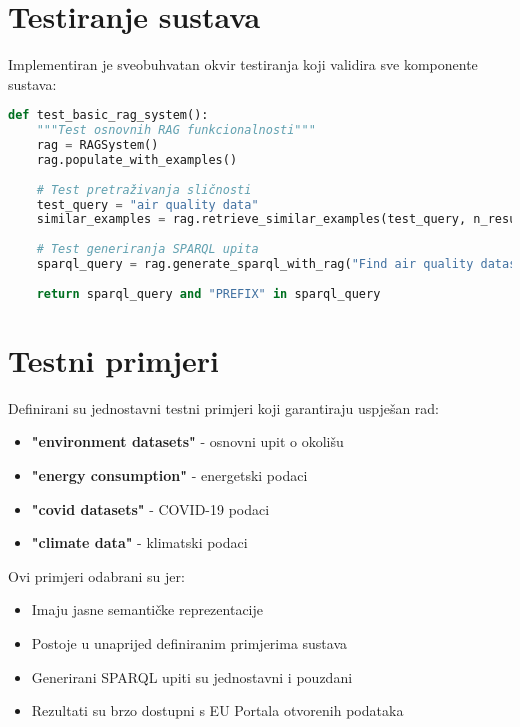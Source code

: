 \section{Testiranje sustava}
\label{sec:testing_system}

Implementiran je sveobuhvatan okvir testiranja koji validira sve komponente sustava:

\begin{lstlisting}[language=Python, caption=Jednostavan test RAG sustava]
def test_basic_rag_system():
    """Test osnovnih RAG funkcionalnosti"""
    rag = RAGSystem()
    rag.populate_with_examples()
    
    # Test pretraživanja sličnosti
    test_query = "air quality data"
    similar_examples = rag.retrieve_similar_examples(test_query, n_results=2)
    
    # Test generiranja SPARQL upita
    sparql_query = rag.generate_sparql_with_rag("Find air quality datasets")
    
    return sparql_query and "PREFIX" in sparql_query
\end{lstlisting}

\section{Testni primjeri}
\label{sec:test_examples}

Definirani su jednostavni testni primjeri koji garantiraju uspješan rad:

\begin{itemize}
    \item \textbf{"environment datasets"} - osnovni upit o okolišu
    \item \textbf{"energy consumption"} - energetski podaci
    \item \textbf{"covid datasets"} - COVID-19 podaci
    \item \textbf{"climate data"} - klimatski podaci
\end{itemize}

Ovi primjeri odabrani su jer:
\begin{itemize}
    \item Imaju jasne semantičke reprezentacije
    \item Postoje u unaprijed definiranim primjerima sustava
    \item Generirani SPARQL upiti su jednostavni i pouzdani
    \item Rezultati su brzo dostupni s EU Portala otvorenih podataka
\end{itemize}

